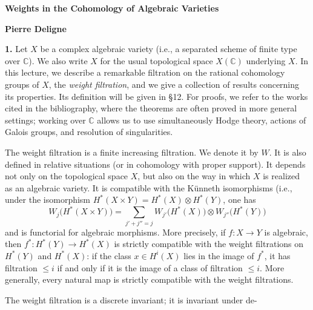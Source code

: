 \documentclass[8pt]{extarticle}
\newcommand{\DSourceFolio}{--}
\newcommand{\DAuthorityPage}{--}
\newcommand{\SourcePage}[2]{%
  \renewcommand{\DSourceFolio}{#1}%
  \renewcommand{\DAuthorityPage}{#2}%
  \thispagestyle{dpage}%
}
\newcommand{\ReaderFont}{\fontsize{7.35}{8.15}\selectfont}
\newcommand{\NumPara}[1]{\par\noindent\textbf{#1}\enspace}
\newcommand{\C}{\mathbb{C}}
\begin{document}
\ReaderFont

\SourcePage{79}{1}

\vspace*{15mm}
\begin{center}
{\sffamily\bfseries\fontsize{15}{17}\selectfont Weights in the Cohomology of Algebraic Varieties\par}
\vspace{5mm}
{\sffamily\bfseries\fontsize{10}{11}\selectfont Pierre Deligne\par}
\end{center}
\vspace{5mm}

\NumPara{1.} Let \(X\) be a complex algebraic variety (i.e., a separated scheme of finite type over \(\C\)). We also write \(X\) for the usual topological space \(X(\C)\) underlying \(X\). In this lecture, we describe a remarkable filtration on the rational cohomology groups of \(X\), the \emph{weight filtration}, and we give a collection of results concerning its properties. Its definition will be given in §12. For proofs, we refer to the works cited in the bibliography, where the theorems are often proved in more general settings; working over \(\C\) allows us to use simultaneously Hodge theory, actions of Galois groups, and resolution of singularities.

The weight filtration is a finite increasing filtration. We denote it by \(W\). It is also defined in relative situations (or in cohomology with proper support). It depends not only on the topological space \(X\), but also on the way in which \(X\) is realized as an algebraic variety. It is compatible with the Künneth isomorphisms (i.e., under the isomorphism \(H^*(X\times Y)=H^*(X)\otimes H^*(Y)\), one has
\[
W_j\bigl(H^*(X\times Y)\bigr)=\sum_{j'+j''=j}W_{j'}\bigl(H^*(X)\bigr)\otimes W_{j''}\bigl(H^*(Y)\bigr)
\]
and is functorial for algebraic morphisms. More precisely, if \(f:X\to Y\) is algebraic, then \(f^*:H^*(Y)\to H^*(X)\) is strictly compatible with the weight filtrations on \(H^*(Y)\) and \(H^*(X)\): if the class \(x\in H^i(X)\) lies in the image of \(f^*\), it has filtration \(\le i\) if and only if it is the image of a class of filtration \(\le i\). More generally, every natural map is strictly compatible with the weight filtrations.

The weight filtration is a discrete invariant; it is invariant under de-
\end{document}
